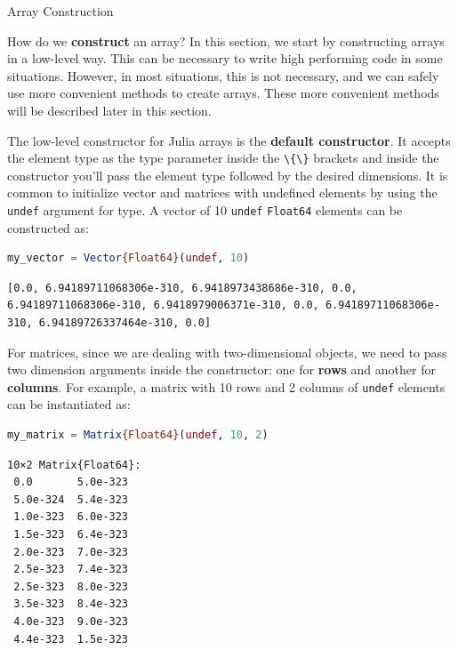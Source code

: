 \documentclass[
  notoc %
]{tufte-book}
\makeatletter
\newcommand{\passthrough}[1]{#1}
\renewcommand\subsubsection{%
\@startsection{subsubsection}{3}{\z@ }{-3.25ex\@plus -1ex \@minus -.2ex}{1.5ex \@plus .2ex}{\normalfont \normalsize \bfseries }
}
\makeatother
\begin{document}
\hypertarget{sec:array_construction}{%
\subsubsection{Array Construction}\label{sec:array_construction}}

How do we \textbf{construct} an array? In this section, we start by
constructing arrays in a low-level way. This can be necessary to write
high performing code in some situations. However, in most situations,
this is not necessary, and we can safely use more convenient methods to
create arrays. These more convenient methods will be described later in
this section.

The low-level constructor for Julia arrays is the \textbf{default
constructor}. It accepts the element type as the type parameter inside
the \passthrough{\lstinline!\{\}!} brackets and inside the constructor
you'll pass the element type followed by the desired dimensions. It is
common to initialize vector and matrices with undefined elements by
using the \passthrough{\lstinline!undef!} argument for type. A vector of
10 \passthrough{\lstinline!undef!} \passthrough{\lstinline!Float64!}
elements can be constructed as:

\begin{lstlisting}[language=Julia]
my_vector = Vector{Float64}(undef, 10)
\end{lstlisting}

\begin{lstlisting}[language=Output]
[0.0, 6.94189711068306e-310, 6.9418973438686e-310, 0.0, 6.94189711068306e-310, 6.9418979006371e-310, 0.0, 6.94189711068306e-310, 6.94189726337464e-310, 0.0]
\end{lstlisting}

For matrices, since we are dealing with two-dimensional objects, we need
to pass two dimension arguments inside the constructor: one for
\textbf{rows} and another for \textbf{columns}. For example, a matrix
with 10 rows and 2 columns of \passthrough{\lstinline!undef!} elements
can be instantiated as:

\begin{lstlisting}[language=Julia]
my_matrix = Matrix{Float64}(undef, 10, 2)
\end{lstlisting}

\begin{lstlisting}[language=Output]
10×2 Matrix{Float64}:
 0.0       5.0e-323
 5.0e-324  5.4e-323
 1.0e-323  6.0e-323
 1.5e-323  6.4e-323
 2.0e-323  7.0e-323
 2.5e-323  7.4e-323
 2.5e-323  8.0e-323
 3.5e-323  8.4e-323
 4.0e-323  9.0e-323
 4.4e-323  1.5e-323
\end{lstlisting}
\end{document}
